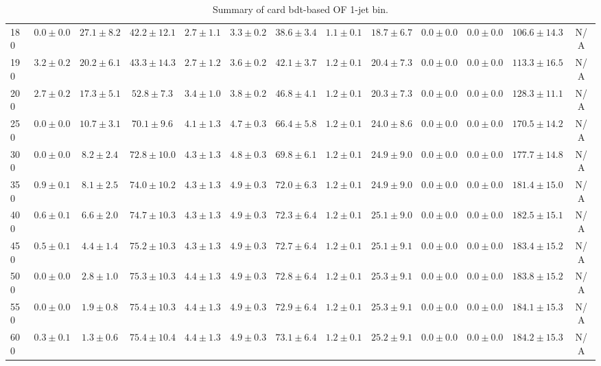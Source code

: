 \begin{table}
{\begin{center}
\begin{tabular}{l | c c | c c c c c c c c  | c c}
180 & $0.0\pm0.0$ & $27.1\pm8.2$ & $42.2\pm12.1$ & $2.7\pm1.1$ & $3.3\pm0.2$ & $38.6\pm3.4$ & $1.1\pm0.1$ & $18.7\pm6.7$ & $0.0\pm0.0$ & $0.0\pm0.0$ & $106.6\pm14.3$ & N/A \\
190 & $3.2\pm0.2$ & $20.2\pm6.1$ & $43.3\pm14.3$ & $2.7\pm1.2$ & $3.6\pm0.2$ & $42.1\pm3.7$ & $1.2\pm0.1$ & $20.4\pm7.3$ & $0.0\pm0.0$ & $0.0\pm0.0$ & $113.3\pm16.5$ & N/A \\
200 & $2.7\pm0.2$ & $17.3\pm5.1$ & $52.8\pm7.3$ & $3.4\pm1.0$ & $3.8\pm0.2$ & $46.8\pm4.1$ & $1.2\pm0.1$ & $20.3\pm7.3$ & $0.0\pm0.0$ & $0.0\pm0.0$ & $128.3\pm11.1$ & N/A \\
250 & $0.0\pm0.0$ & $10.7\pm3.1$ & $70.1\pm9.6$ & $4.1\pm1.3$ & $4.7\pm0.3$ & $66.4\pm5.8$ & $1.2\pm0.1$ & $24.0\pm8.6$ & $0.0\pm0.0$ & $0.0\pm0.0$ & $170.5\pm14.2$ & N/A \\
300 & $0.0\pm0.0$ & $8.2\pm2.4$ & $72.8\pm10.0$ & $4.3\pm1.3$ & $4.8\pm0.3$ & $69.8\pm6.1$ & $1.2\pm0.1$ & $24.9\pm9.0$ & $0.0\pm0.0$ & $0.0\pm0.0$ & $177.7\pm14.8$ & N/A \\
350 & $0.9\pm0.1$ & $8.1\pm2.5$ & $74.0\pm10.2$ & $4.3\pm1.3$ & $4.9\pm0.3$ & $72.0\pm6.3$ & $1.2\pm0.1$ & $24.9\pm9.0$ & $0.0\pm0.0$ & $0.0\pm0.0$ & $181.4\pm15.0$ & N/A \\
400 & $0.6\pm0.1$ & $6.6\pm2.0$ & $74.7\pm10.3$ & $4.3\pm1.3$ & $4.9\pm0.3$ & $72.3\pm6.4$ & $1.2\pm0.1$ & $25.1\pm9.0$ & $0.0\pm0.0$ & $0.0\pm0.0$ & $182.5\pm15.1$ & N/A \\
450 & $0.5\pm0.1$ & $4.4\pm1.4$ & $75.2\pm10.3$ & $4.3\pm1.3$ & $4.9\pm0.3$ & $72.7\pm6.4$ & $1.2\pm0.1$ & $25.1\pm9.1$ & $0.0\pm0.0$ & $0.0\pm0.0$ & $183.4\pm15.2$ & N/A \\
500 & $0.0\pm0.0$ & $2.8\pm1.0$ & $75.3\pm10.3$ & $4.4\pm1.3$ & $4.9\pm0.3$ & $72.8\pm6.4$ & $1.2\pm0.1$ & $25.3\pm9.1$ & $0.0\pm0.0$ & $0.0\pm0.0$ & $183.8\pm15.2$ & N/A \\
550 & $0.0\pm0.0$ & $1.9\pm0.8$ & $75.4\pm10.3$ & $4.4\pm1.3$ & $4.9\pm0.3$ & $72.9\pm6.4$ & $1.2\pm0.1$ & $25.3\pm9.1$ & $0.0\pm0.0$ & $0.0\pm0.0$ & $184.1\pm15.3$ & N/A \\
600 & $0.3\pm0.1$ & $1.3\pm0.6$ & $75.4\pm10.4$ & $4.4\pm1.3$ & $4.9\pm0.3$ & $73.1\pm6.4$ & $1.2\pm0.1$ & $25.2\pm9.1$ & $0.0\pm0.0$ & $0.0\pm0.0$ & $184.2\pm15.3$ & N/A \\
\hline
\end{tabular}
\end{center}
}
\caption{Summary of card bdt-based OF 1-jet bin.}
\end{table}
